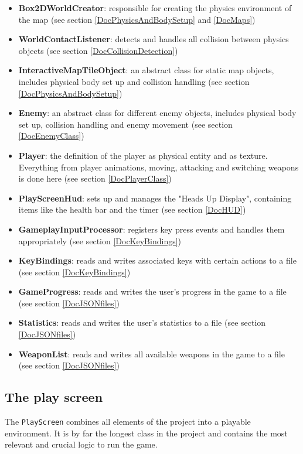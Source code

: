 \documentclass[12p]{article}
\begin{document}
\begin{itemize}
  \item \textbf{Box2DWorldCreator}: responsible for creating the physics environment of the map (see section \ref{DocPhysicsAndBodySetup} and \ref{DocMaps})
  \item \textbf{WorldContactListener}: detects and handles all collision between physics objects (see section \ref{DocCollisionDetection})
  \item \textbf{InteractiveMapTileObject}: an abstract class for static map objects, includes physical body set up and collision handling (see section \ref{DocPhysicsAndBodySetup})
  \item \textbf{Enemy}: an abstract class for different enemy objects, includes physical body set up, collision handling and enemy movement (see section \ref{DocEnemyClass})
  \item \textbf{Player}: the definition of the player as physical entity and as texture. Everything from player animations, moving, attacking and switching weapons is done here (see section \ref{DocPlayerClass})
  \item \textbf{PlayScreenHud}: sets up and manages the "Heads Up Display", containing items like the health bar and the timer (see section \ref{DocHUD})
  \item \textbf{GameplayInputProcessor}: registers key press events and handles them appropriately (see section \ref{DocKeyBindings})
  \item \textbf{KeyBindings}: reads and writes associated keys with certain actions to a file (see section \ref{DocKeyBindings})
  \item \textbf{GameProgress}: reads and writes the user's progress in the game to a file (see section \ref{DocJSONfiles})
  \item \textbf{Statistics}: reads and writes the user's statistics to a file (see section \ref{DocJSONfiles})
  \item \textbf{WeaponList}: reads and writes all available weapons in the game to a file (see section \ref{DocJSONfiles})
\end{itemize}

 
 \newpage
\subsection{The play screen} \label{DocPlayScreen}

The \texttt{PlayScreen} combines all elements of the project into a playable environment. It is by far the longest class in the project and contains the most relevant and crucial logic to run the game.
\end{document}
